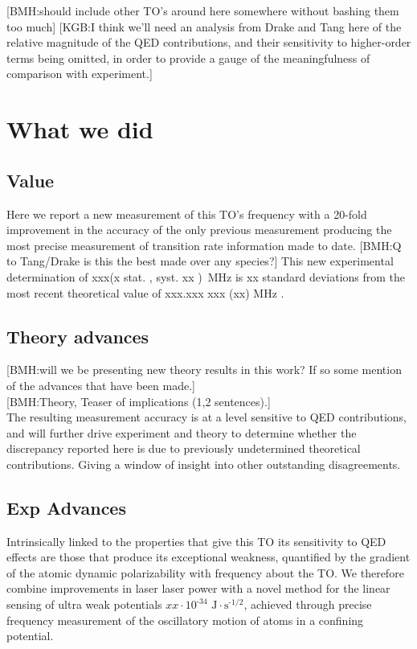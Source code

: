 \documentclass[aps,prl,
,reprint,
superscriptaddress,
onecolumn,
showpacs,preprintnumbers,
 amsmath,amssymb,
]{revtex4-1}
\newcommand{\brycecom}[1]{{\color{ProcessBlue}[BMH:{#1}]\normalcolor}} %
\newcommand{\kencom}[1]{{\color{Red}[KGB:{#1}]\normalcolor}} %
\begin{document}
\brycecom{should include other TO's around here somewhere without bashing them too much}
\kencom{I think we’ll need an analysis from Drake and Tang here of the relative magnitude of the QED
contributions, and their sensitivity to higher-order terms being omitted, in order to provide a
gauge of the meaningfulness of comparison with experiment.}


\section{What we did}
\subsection{Value}
Here we report a new measurement of this TO's frequency with a 20-fold improvement in the accuracy of the only previous measurement \cite{PhysRevLett.115.043004} producing the most precise measurement of transition rate information made to date. %
\brycecom{Q to Tang/Drake is this the best made over any species?}
This new experimental determination of xxx(x stat. ,  syst. xx )~MHz is xx standard deviations from the most recent theoretical value of xxx.xxx xxx (xx) MHz \cite{PhysRevA.99.040502}. 
\subsection{Theory advances}
\brycecom{will we be presenting new theory results in this work? If so some mention of the advances that have been made.}\\
\brycecom{Theory, Teaser of implications (1,2 sentences).}\\

The resulting measurement accuracy is at a level sensitive to QED contributions, and will further drive experiment and theory to determine whether the discrepancy reported here is due to previously undetermined theoretical contributions. Giving a window of insight into other outstanding disagreements.

\subsection{Exp Advances}

Intrinsically linked to the properties that give this TO its sensitivity to QED effects are those that produce its exceptional weakness, quantified by the gradient of the atomic dynamic polarizability with frequency about the TO. We therefore combine improvements in laser laser power with a novel method for the linear sensing of ultra weak potentials \(xx\cdot10^{\text{-}34}\text{~J}\cdot\text{s}^{\text{-}1/2}\), achieved through precise frequency measurement of the oscillatory motion of atoms in a confining potential. 
\end{document}
